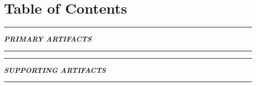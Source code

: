 \documentclass[]{article}
\newcommand{\pdflink}[2]{
\hyperlink{#1.1}{\textbf{#2}}
}
\begin{document}



\section*{Table of Contents}

\hrule

\textbf{\textit{PRIMARY ARTIFACTS}}

\hrule

%
%
%
%
%
%
%
%
%
%
%

\hrule

\textbf{\textit{SUPPORTING ARTIFACTS}}

\hrule

%
%
%
%
%
%
%
%
%
%
%
%
%
%
%
%
%
%

\end{document}

